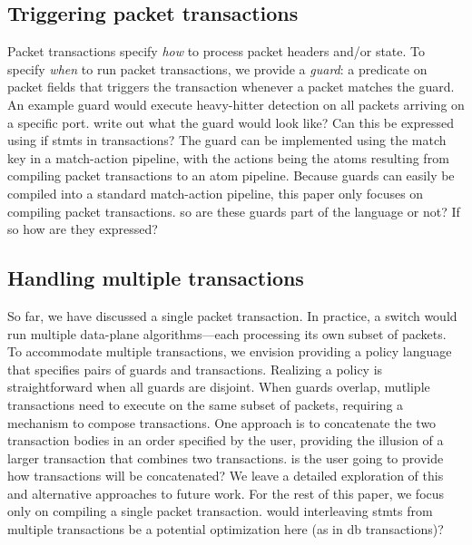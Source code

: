 \subsection{Triggering packet transactions}
\label{ss:guards}
Packet transactions specify \textit{how} to process packet headers and/or
state.  To specify {\em when} to run packet transactions, we provide a {\em
guard}: a predicate on packet fields that triggers the transaction whenever a
packet matches the guard. An example guard would execute heavy-hitter detection
on all packets arriving on a specific port. \ac{write out what the guard would
look like? Can this be expressed using if stmts in transactions?} 
The guard can be implemented using
the match key in a match-action pipeline, with the actions being the atoms
resulting from compiling packet transactions to an atom pipeline. Because
guards can easily be compiled into a standard match-action pipeline, this paper
only focuses on compiling packet transactions. \ac{so are these guards part of 
the language or not? If so how are they expressed?}

\subsection{Handling multiple transactions}
\label{ss:multiple}
So far, we have discussed a single packet transaction. In practice, a switch
would run multiple data-plane algorithms---each processing its own subset of
packets. To accommodate multiple transactions, we envision providing a policy
language that specifies pairs of guards and transactions. Realizing a policy is
straightforward when all guards are disjoint. When guards overlap, mutliple
transactions need to execute on the same subset of packets, requiring a
mechanism to compose transactions. One approach is to concatenate the two
transaction bodies in an order specified by the user, providing the illusion of
a larger transaction that combines two transactions. \ac{is the user going to 
provide how transactions will be concatenated?} We leave a detailed
exploration of this and alternative approaches to future work. For the rest of
this paper, we focus only on compiling a single packet transaction.
\ac{would interleaving stmts from multiple transactions be a potential 
optimization here (as in db transactions)?}
